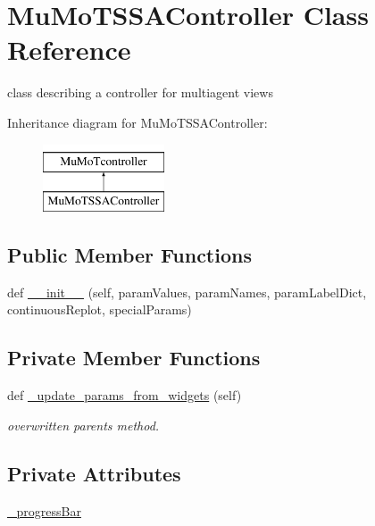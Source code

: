 \hypertarget{class_mu_mo_t_1_1_mu_mo_t_s_s_a_controller}{}\section{Mu\+Mo\+T\+S\+S\+A\+Controller Class Reference}
\label{class_mu_mo_t_1_1_mu_mo_t_s_s_a_controller}


class describing a controller for multiagent views  


Inheritance diagram for Mu\+Mo\+T\+S\+S\+A\+Controller\+:\begin{figure}[H]
\begin{center}
\leavevmode
\includegraphics[height=2.000000cm]{class_mu_mo_t_1_1_mu_mo_t_s_s_a_controller}
\end{center}
\end{figure}
\subsection*{Public Member Functions}
\begin{DoxyCompactItemize}
\item 
def \hyperlink{class_mu_mo_t_1_1_mu_mo_t_s_s_a_controller_a203e76c007a565312c5715712851aadb}{\+\_\+\+\_\+init\+\_\+\+\_\+} (self, param\+Values, param\+Names, param\+Label\+Dict, continuous\+Replot, special\+Params)
\end{DoxyCompactItemize}
\subsection*{Private Member Functions}
\begin{DoxyCompactItemize}
\item 
def \hyperlink{class_mu_mo_t_1_1_mu_mo_t_s_s_a_controller_add4eacb8e812feeca1d4b2538e3bd6e0}{\+\_\+update\+\_\+params\+\_\+from\+\_\+widgets} (self)
\begin{DoxyCompactList}\small\item\em overwritten parent\textquotesingle{}s method. \end{DoxyCompactList}\end{DoxyCompactItemize}
\subsection*{Private Attributes}
\begin{DoxyCompactItemize}
\item 
\hyperlink{class_mu_mo_t_1_1_mu_mo_t_s_s_a_controller_a018864aa22d2adb0d3958fb0adbce8e2}{\+\_\+progress\+Bar}
\end{DoxyCompactItemize}
